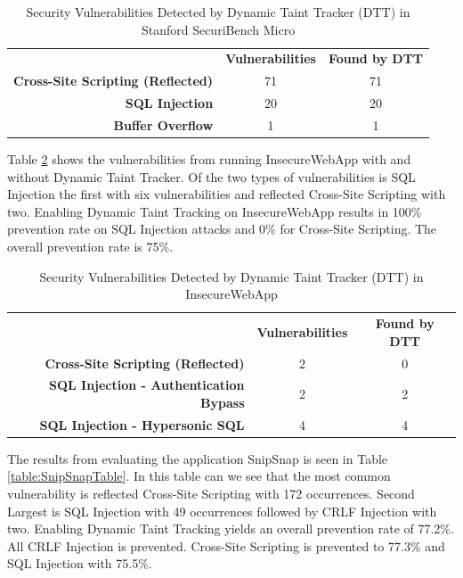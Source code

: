 \begin{table}[!hbt]
  \centering
  \caption{Security Vulnerabilities Detected by Dynamic Taint Tracker (DTT) in Stanford SecuriBench Micro}
  \label{table:MicroTable}
    \begin{tabular}{rcc}
      & \textbf{Vulnerabilities} & \textbf{Found by DTT} \\
      \textbf{Cross-Site Scripting (Reflected)} & 71            & 71  \\
      \textbf{SQL Injection}                    & 20            & 20  \\
      \textbf{Buffer Overflow}                  & 1             & 1  
    \end{tabular}
\end{table}

Table \ref{table:InsecureTable} shows the vulnerabilities from running InsecureWebApp \parencite{insecure} with and without Dynamic Taint Tracker. Of the two types of vulnerabilities is SQL Injection the first with six vulnerabilities and reflected Cross-Site Scripting with two. Enabling Dynamic Taint Tracking on InsecureWebApp \parencite{insecure} results in 100\% prevention rate on SQL Injection attacks and 0\% for Cross-Site Scripting. The overall prevention rate is 75\%. 

\begin{table}[!hbt]
  \centering
  \caption{Security Vulnerabilities Detected by Dynamic Taint Tracker (DTT) in InsecureWebApp}
  \label{table:InsecureTable}
    \begin{tabular}{rcc}
      & \textbf{Vulnerabilities} & \textbf{Found by DTT} \\
      \textbf{Cross-Site Scripting (Reflected)}      & 2             & 0  \\
      \textbf{SQL Injection - Authentication Bypass} & 2             & 2  \\
      \textbf{SQL Injection - Hypersonic SQL}        & 4             & 4  
    \end{tabular}
\end{table}

The results from evaluating the application SnipSnap \parencite{snipsnap} is seen in Table \ref{table:SnipSnapTable}. In this table can we see that the most common vulnerability is reflected Cross-Site Scripting with 172 occurrences. Second Largest is SQL Injection with 49 occurrences followed by CRLF Injection with two. Enabling Dynamic Taint Tracking yields an overall prevention rate of 77.2\%. All CRLF Injection is prevented. Cross-Site Scripting is prevented to 77.3\% and SQL Injection with 75.5\%.

